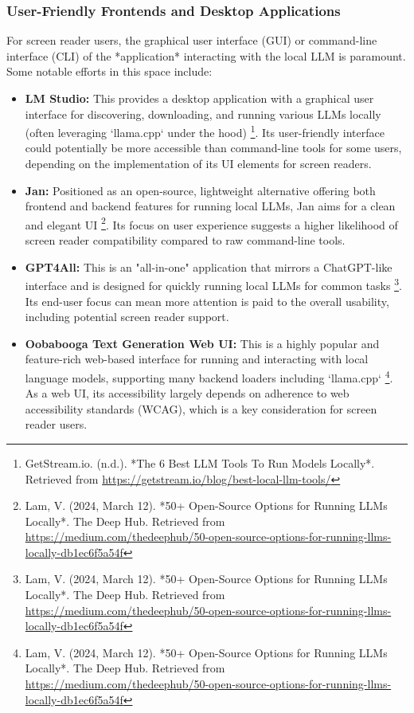 \subsubsection{User-Friendly Frontends and Desktop Applications}
For screen reader users, the graphical user interface (GUI) or command-line interface (CLI) of the *application* interacting with the local LLM is paramount. Some notable efforts in this space include:
\begin{itemize}

    \item \textbf{LM Studio:} This provides a desktop application with a graphical user interface for discovering, downloading, and running various LLMs locally (often leveraging `llama.cpp` under the hood) \footnote{GetStream.io. (n.d.). *The 6 Best LLM Tools To Run Models Locally*. Retrieved from \url{https://getstream.io/blog/best-local-llm-tools/}}. Its user-friendly interface could potentially be more accessible than command-line tools for some users, depending on the implementation of its UI elements for screen readers.

    \item \textbf{Jan:} Positioned as an open-source, lightweight alternative offering both frontend and backend features for running local LLMs, Jan aims for a clean and elegant UI \footnote{Lam, V. (2024, March 12). *50+ Open-Source Options for Running LLMs Locally*. The Deep Hub. Retrieved from \url{https://medium.com/thedeephub/50-open-source-options-for-running-llms-locally-db1ec6f5a54f}}. Its focus on user experience suggests a higher likelihood of screen reader compatibility compared to raw command-line tools.

    \item \textbf{GPT4All:} This is an "all-in-one" application that mirrors a ChatGPT-like interface and is designed for quickly running local LLMs for common tasks \footnote{Lam, V. (2024, March 12). *50+ Open-Source Options for Running LLMs Locally*. The Deep Hub. Retrieved from \url{https://medium.com/thedeephub/50-open-source-options-for-running-llms-locally-db1ec6f5a54f}}. Its end-user focus can mean more attention is paid to the overall usability, including potential screen reader support.

    \item \textbf{Oobabooga Text Generation Web UI:} This is a highly popular and feature-rich web-based interface for running and interacting with local language models, supporting many backend loaders including `llama.cpp` \footnote{Lam, V. (2024, March 12). *50+ Open-Source Options for Running LLMs Locally*. The Deep Hub. Retrieved from \url{https://medium.com/thedeephub/50-open-source-options-for-running-llms-locally-db1ec6f5a54f}}. As a web UI, its accessibility largely depends on adherence to web accessibility standards (WCAG), which is a key consideration for screen reader users.

\end{itemize}

